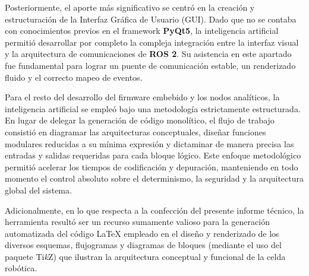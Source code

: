 \documentclass[12pt, a4paper]{report}
\begin{document}
Posteriormente, el aporte más significativo se centró en la creación y estructuración de la Interfaz Gráfica de Usuario (GUI). Dado que no se contaba con conocimientos previos en el framework \textbf{PyQt5}, la inteligencia artificial permitió desarrollar por completo la compleja integración entre la interfaz visual y la arquitectura de comunicaciones de \textbf{ROS 2}. Su asistencia en este apartado fue fundamental para lograr un puente de comunicación estable, un renderizado fluido y el correcto mapeo de eventos.

Para el resto del desarrollo del firmware embebido y los nodos analíticos, la inteligencia artificial se empleó bajo una metodología estrictamente estructurada. En lugar de delegar la generación de código monolítico, el flujo de trabajo consistió en diagramar las arquitecturas conceptuales, diseñar funciones modulares reducidas a su mínima expresión y dictaminar de manera precisa las entradas y salidas requeridas para cada bloque lógico. Este enfoque metodológico permitió acelerar los tiempos de codificación y depuración, manteniendo en todo momento el control absoluto sobre el determinismo, la seguridad y la arquitectura global del sistema.

Adicionalmente, en lo que respecta a la confección del presente informe técnico, la herramienta resultó ser un recurso sumamente valioso para la generación automatizada del código \LaTeX{} empleado en el diseño y renderizado de los diversos esquemas, flujogramas y diagramas de bloques (mediante el uso del paquete Ti\textit{k}Z) que ilustran la arquitectura conceptual y funcional de la celda robótica.
\nocite{*}


\end{document}

